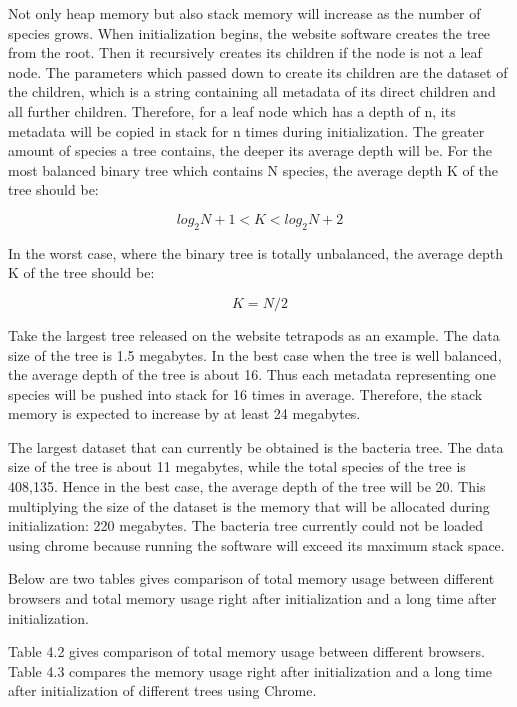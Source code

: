 \documentclass[MSc]{icldt}
\begin{document}
Not only heap memory but also stack memory will increase as the number of species grows. When initialization begins, the website software creates the tree from the root. Then it recursively creates its children if the node is not a leaf node. The parameters which passed down to create its children are the dataset of the children, which is a string containing all metadata of its direct children and all further children. Therefore, for a leaf node which has a depth of n, its metadata will be copied in stack for n times during initialization. The greater amount of species a tree contains, the deeper its average depth will be. For the most balanced binary tree which contains N species, the average depth K of the tree should be:

\begin{equation*}
log_2 N + 1 < K < log_2 N + 2
\end{equation*}

In the worst case, where the binary tree is totally unbalanced, the average depth K of the tree should be:

 \begin{equation*}
	K = N/2
\end{equation*}

Take the largest tree released on the website tetrapods as an example. The data size of the tree is 1.5 megabytes. In the best case when the tree is well balanced, the average depth of the tree is about 16. Thus each metadata representing one species will be pushed into stack for 16 times in average. Therefore, the stack memory is expected to increase by at least 24 megabytes.

 The largest dataset that can currently be obtained is the bacteria tree. The data size of the tree is about 11 megabytes, while the total species of the tree is 408,135. Hence in the best case, the average depth of the tree will be 20. This multiplying the size of the dataset is the memory that will be allocated during initialization: 220 megabytes. The bacteria tree currently could not be loaded using chrome because running the software will exceed its maximum stack space. 
 
 Below are two tables gives comparison of total memory usage between different browsers and total memory usage right after initialization and a long time after initialization.
 
 Table 4.2 gives comparison of total memory usage between different browsers. Table 4.3 compares the memory usage right after initialization and a long time after initialization of different trees using Chrome.
 
\end{document}
